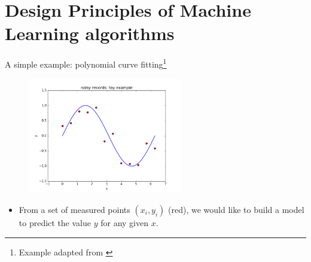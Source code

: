 \documentclass[xcolor=pdftex,dvipsnames,table]{beamer}
\begin{document}
\section{Design Principles of Machine Learning algorithms}

\begin{frame}{A simple example: polynomial curve fitting\footnote{Example adapted from \cite{Bishop2006}}}
\begin{figure}[htb]
\includegraphics[width=0.6\textwidth]{../graphics/sample_from_sin.png}
\end{figure}
\begin{itemize}
	\item From a set of measured points $(x_i, y_i)$ (red), we would like to build a model to predict the value $y$ for any given $x$.
\end{itemize}
\end{frame}
\end{document}
